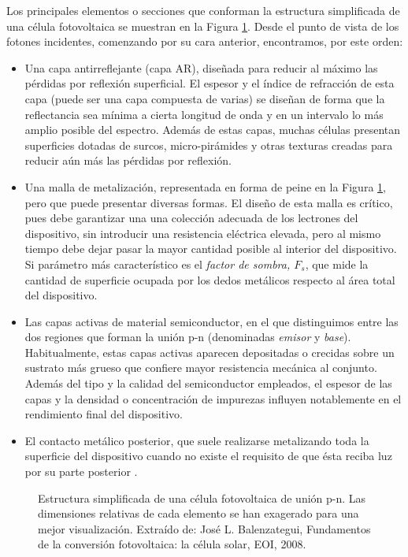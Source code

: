 Los principales elementos o secciones que conforman la estructura simplificada de una célula fotovoltaica se muestran en la Figura \ref{fig:cel}. Desde el punto de vista de los fotones incidentes, comenzando por su cara anterior, encontramos, por este orden:
\begin{itemize}
	\item Una capa antirreflejante (capa AR), diseñada para reducir al máximo las pérdidas por reflexión superficial. El espesor y el índice de refracción de esta capa (puede ser una capa compuesta de varias) se diseñan de forma que la reflectancia sea mínima a cierta longitud de onda y en un
	intervalo lo más amplio posible del espectro. Además de estas capas, muchas células	presentan superficies dotadas de surcos, micro-pirámides y otras texturas creadas para reducir	aún más las pérdidas por reflexión.
	\item  Una malla de metalización, representada en forma de peine en la Figura \ref{fig:cel}, pero que puede presentar diversas formas. El diseño de esta malla es crítico, pues debe garantizar una una colección adecuada de los lectrones del dispositivo, sin introducir una resistencia eléctrica elevada, pero al mismo tiempo debe dejar pasar la mayor cantidad posible al interior del dispositivo. Si parámetro más característico es el \textit{factor de sombra, $F_s$}, que mide la cantidad de superficie ocupada por los dedos metálicos respecto al área total del dispositivo.
	\item Las capas activas de material semiconductor, en el que distinguimos entre las dos regiones que forman la unión p-n (denominadas \textit{emisor} y \textit{base}). Habitualmente, estas capas activas aparecen depositadas o crecidas sobre un sustrato más grueso que confiere mayor resistencia mecánica al conjunto. Además del tipo y la calidad del semiconductor empleados, el espesor de las capas y la densidad o concentración de impurezas influyen notablemente en el rendimiento final del dispositivo.
	\item El contacto metálico posterior, que suele realizarse metalizando toda la superficie del dispositivo cuando no existe el requisito de que ésta reciba luz por su parte posterior \cite{eoi2008}.
	
\end{itemize} 

\begin{figure}[h]
	\centering
	
	\caption{Estructura simplificada de una célula fotovoltaica de unión p-n. Las dimensiones relativas de cada elemento se han exagerado para una mejor visualización. Extraído de: José L. Balenzategui, Fundamentos de la conversión fotovoltaica: la célula solar, EOI, 2008.}
	\label{fig:cel}
	
\end{figure}

